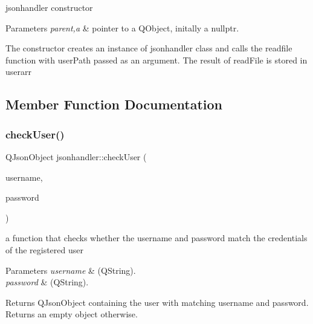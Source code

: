 jsonhandler constructor 


\begin{DoxyParams}{Parameters}
{\em parent,a} & pointer to a Q\+Object, initally a nullptr.\\
\hline
\end{DoxyParams}
The constructor creates an instance of jsonhandler class and calls the readfile function with user\+Path passed as an argument. The result of read\+File is stored in userarr 

\subsection{Member Function Documentation}
\mbox{\label{classjsonhandler_a80a0d472fc04d855cc91c3a39185d344}} 
\subsubsection{\texorpdfstring{check\+User()}{checkUser()}\hspace{0.1cm}{\footnotesize\ttfamily [1/2]}}
{\footnotesize\ttfamily Q\+Json\+Object jsonhandler\+::check\+User (\begin{DoxyParamCaption}\item[{Q\+String}]{username,  }\item[{Q\+String}]{password }\end{DoxyParamCaption})}



a function that checks whether the username and password match the credentials of the registered user 


\begin{DoxyParams}{Parameters}
{\em username} & (Q\+String). \\
\hline
{\em password} & (Q\+String). \\
\hline
\end{DoxyParams}
\begin{DoxyReturn}{Returns}
Q\+Json\+Object containing the user with matching username and password. Returns an empty object otherwise. 
\end{DoxyReturn}
\mbox{\label{classjsonhandler_a3860da83ed54e86300f756f5b66c3d68}} 
